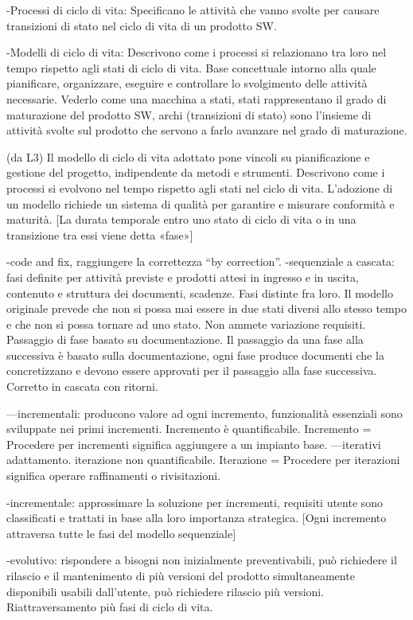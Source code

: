 \documentclass{report}
\begin{document}
-Processi di ciclo di vita: Specificano le attività che vanno svolte per causare transizioni di stato nel ciclo di vita di un prodotto SW.

-Modelli di ciclo di vita: Descrivono come i processi si relazionano tra loro nel tempo rispetto agli stati di ciclo di vita.
Base concettuale intorno alla quale pianificare, organizzare, eseguire e controllare lo svolgimento delle attività necessarie.
Vederlo come una macchina a stati, stati rappresentano il grado di maturazione del prodotto SW, archi (transizioni di stato) sono l’insieme di attività svolte sul prodotto che servono a farlo avanzare nel grado di maturazione.

(da L3)
Il modello di ciclo di vita adottato pone vincoli su pianificazione e gestione del progetto, indipendente da metodi e strumenti. 
Descrivono come i processi si evolvono nel tempo rispetto agli stati nel ciclo di vita.
L’adozione di un modello richiede un sistema di qualità per garantire e misurare conformità e maturità.
[La durata temporale entro uno stato di ciclo di vita o in una transizione tra essi viene detta «fase»]

-code and fix, raggiungere la correttezza “by correction”.
-sequenziale a cascata: fasi definite per attività previste e prodotti attesi in ingresso e in uscita, contenuto e struttura dei documenti, scadenze. Fasi distinte fra loro. Il modello originale prevede che non si possa mai essere in due stati diversi allo stesso tempo e che non si possa tornare ad uno stato. Non ammete variazione requisiti. Passaggio di fase basato su documentazione. Il passaggio da una fase alla successiva è basato sulla documentazione, ogni fase produce documenti che la concretizzano e devono essere approvati per il passaggio alla fase successiva. Corretto in cascata con ritorni.

---incrementali: producono valore ad ogni incremento, funzionalità essenziali sono sviluppate nei primi incrementi. Incremento è quantificabile.
Incremento = Procedere per incrementi significa aggiungere a un impianto base.
---iterativi adattamento. iterazione non quantificabile. 
Iterazione = Procedere per iterazioni significa operare raffinamenti o rivisitazioni.

-incrementale:  approssimare la soluzione per incrementi, requisiti utente sono classificati e trattati in base alla loro importanza strategica. [Ogni incremento attraversa tutte le fasi del modello sequenziale]

-evolutivo: rispondere a bisogni non inizialmente preventivabili, può richiedere il rilascio e il mantenimento di più versioni del prodotto
simultaneamente disponibili usabili dall'utente, può richiedere rilascio più versioni. Riattraversamento più fasi di ciclo di vita. 
\end{document}
